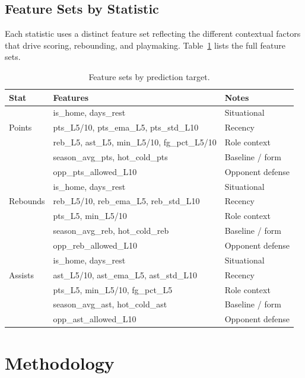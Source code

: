 \documentclass[12pt, letterpaper]{article}
\begin{document}
\subsection{Feature Sets by Statistic}

Each statistic uses a distinct feature set reflecting the different
contextual factors that drive scoring, rebounding, and playmaking.
Table~\ref{tab:features} lists the full feature sets.

\begin{table}[H]
\centering
\caption{Feature sets by prediction target.}
\label{tab:features}
\begin{tabular}{llp{7cm}}
\toprule
\textbf{Stat} & \textbf{Features} & \textbf{Notes} \\
\midrule
\multirow{3}{*}{Points}
  & is\_home, days\_rest & Situational \\
  & pts\_L5/10, pts\_ema\_L5, pts\_std\_L10 & Recency \\
  & reb\_L5, ast\_L5, min\_L5/10, fg\_pct\_L5/10 & Role context \\
  & season\_avg\_pts, hot\_cold\_pts & Baseline / form \\
  & opp\_pts\_allowed\_L10 & Opponent defense \\
\midrule
\multirow{3}{*}{Rebounds}
  & is\_home, days\_rest & Situational \\
  & reb\_L5/10, reb\_ema\_L5, reb\_std\_L10 & Recency \\
  & pts\_L5, min\_L5/10 & Role context \\
  & season\_avg\_reb, hot\_cold\_reb & Baseline / form \\
  & opp\_reb\_allowed\_L10 & Opponent defense \\
\midrule
\multirow{3}{*}{Assists}
  & is\_home, days\_rest & Situational \\
  & ast\_L5/10, ast\_ema\_L5, ast\_std\_L10 & Recency \\
  & pts\_L5, min\_L5/10, fg\_pct\_L5 & Role context \\
  & season\_avg\_ast, hot\_cold\_ast & Baseline / form \\
  & opp\_ast\_allowed\_L10 & Opponent defense \\
\bottomrule
\end{tabular}
\end{table}

\section{Methodology}
\label{sec:method}
\end{document}
